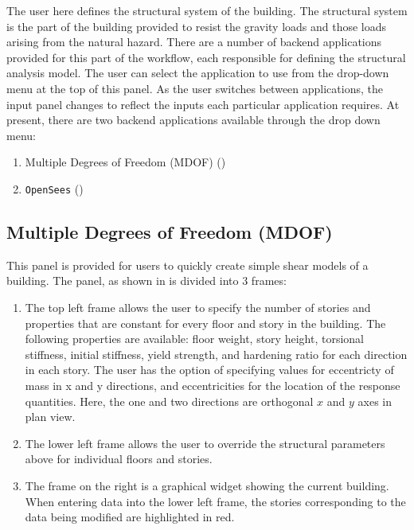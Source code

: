 The user here defines the structural system of the
building. The  structural system is the part of the building provided
to resist the gravity loads and those loads arising from the natural hazard. 
There are a number of backend applications provided for this part of the workflow, 
each responsible for defining the structural analysis model. The user can select 
the application to use from the drop-down menu at the top of this panel. As the 
user switches between applications,
the input panel changes to reflect the inputs each particular application requires. At present, there are two backend applications
available through the drop down menu: 

\begin{enumerate}
\item Multiple Degrees of Freedom (MDOF) ()
\item \texttt{OpenSees} ()
\end{enumerate}

\subsection{Multiple Degrees of Freedom (MDOF)}\label{sec:MDOF}

This panel is provided for users to quickly create simple shear models
of a building. The panel, as shown in  is divided
into 3 frames:
\begin{enumerate}
\item The top left frame allows the user to specify the number of stories and properties that are constant for every floor and story in the building. The following properties are available: floor weight, story height, torsional stiffness, initial stiffness, yield strength, and hardening ratio for each direction in each story. The user has the option of specifying values for eccentricty of mass in x and y directions, and eccentricities for the location of the response quantities. Here, the one and two directions are orthogonal $x$ and $y$ axes in plan view.
\item The lower left frame allows the user to override the structural parameters above for individual floors and stories.
\item The frame on the right is a graphical widget showing the current building. When entering data into the lower left frame, the stories corresponding to the data being modified are highlighted in red.
\end{enumerate}


